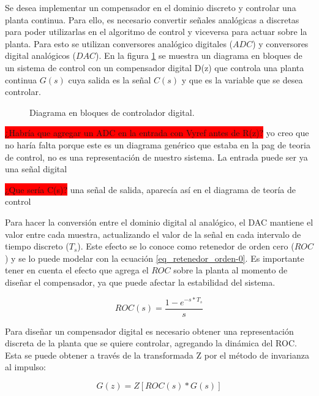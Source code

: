 Se desea implementar un compensador en el dominio discreto y controlar una planta continua. Para ello, es necesario convertir señales analógicas a discretas para poder utilizarlas en el algoritmo de control y viceversa para actuar sobre la planta. Para esto se utilizan conversores analógico digitales ($ADC$) y conversores digital analógicos ($DAC$). En la figura \ref{fig:diag-general-digital} se muestra un diagrama en bloques de un sistema de control con un compensador digital D(z) que controla una planta continua $G(s)$ cuya salida es la señal $C(s)$ y que es la variable que se desea controlar.

\begin{figure}[H]
	\centering
	
	\caption{Diagrama en bloques de controlador digital.}	\label{fig:diag-general-digital}
\end{figure}

\colorbox{red}{¿Habría que agregar un ADC en la entrada con Vyref antes de R(z)?} yo creo que no haría falta porque este es un diagrama genérico que estaba en la pag de teoria de control, no es una representación de nuestro sistema. La entrada puede ser ya una señal digital


\colorbox{red}{¿Que sería C(s)?} una señal de salida, aparecía así en el diagrama de teoría de control



Para hacer la conversión entre el dominio digital al analógico, el DAC mantiene el valor entre cada muestra, actualizando el valor de la señal en cada intervalo de tiempo discreto ($T_s$). Este efecto se lo conoce como retenedor de orden cero ($ROC$) y se lo puede modelar con la ecuación \ref{eq_retenedor_orden-0}. Es importante tener en cuenta el efecto que agrega el $ROC$ sobre la planta al momento de diseñar el compensador, ya que puede afectar la estabilidad del sistema.

\begin{equation}\label{eq_retenedor_orden-0}
	ROC(s)=\frac{1-e^{-s*T_s}}{s}
\end{equation}

Para diseñar un compensador digital es necesario obtener una representación discreta de la planta que se quiere controlar, agregando la dinámica del ROC. Esta se puede obtener a través de la transformada Z por el método de invarianza al impulso:

\begin{equation*}
	G(z)= Z[ROC(s)*G(s)]
\end{equation*}

